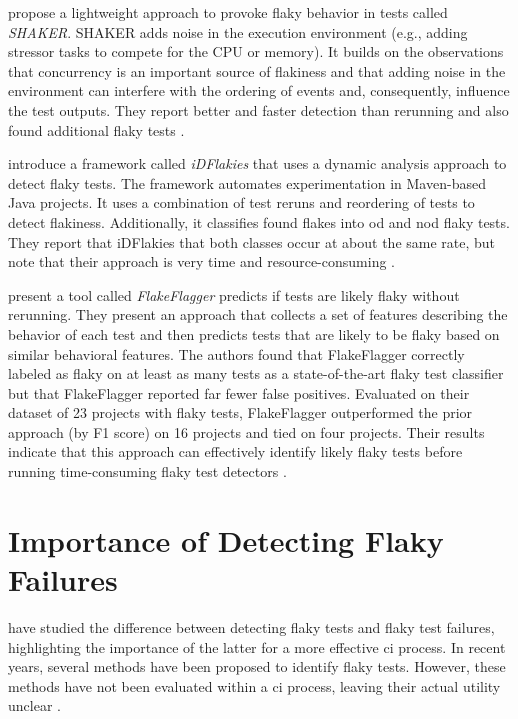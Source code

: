  propose a lightweight approach to provoke flaky behavior in tests called \emph{SHAKER}.
SHAKER adds noise in the execution environment (e.g., adding stressor tasks to compete for the CPU or memory).
It builds on the observations that concurrency is an important source of flakiness and that adding noise in the environment can interfere with the ordering of events and, consequently, influence the test outputs.
They report better and faster detection than rerunning and also found additional flaky tests \autocite{silva_shake_2020}.

 introduce a framework called \emph{iDFlakies} that uses a dynamic analysis approach to detect flaky tests.
The framework automates experimentation in Maven-based Java projects.
It uses a combination of test reruns and reordering of tests to detect flakiness.
Additionally, it classifies found flakes into \ac{od} and \ac{nod} flaky tests.
They report that iDFlakies that both classes occur at about the same rate, but note that their approach is very time and resource-consuming \autocite{lam_idflakies_2019}.

 present a tool called \emph{FlakeFlagger} predicts if tests are likely flaky without rerunning.
They present an approach that collects a set of features describing the behavior of each test and then predicts tests that are likely to be flaky based on similar behavioral features.
The authors found that FlakeFlagger correctly labeled as flaky on at least as many tests as a state-of-the-art flaky test classifier but that FlakeFlagger reported far fewer false positives.
Evaluated on their dataset of 23 projects with flaky tests, FlakeFlagger outperformed the prior approach (by F1 score) on 16 projects and tied on four projects.
Their results indicate that this approach can effectively identify likely flaky tests before running time-consuming flaky test detectors \autocite{alshammari_flakeflagger_2021}.

\section{Importance of Detecting Flaky Failures}
 have studied the difference between detecting flaky tests and flaky test failures, highlighting the importance of the latter for a more effective \ac{ci} process.
In recent years, several methods have been proposed to identify flaky tests.
However, these methods have not been evaluated within a \ac{ci} process, leaving their actual utility unclear \autocite{haben_importance_2023}.

